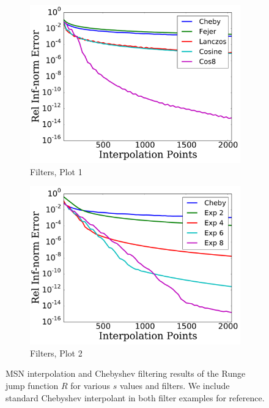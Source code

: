 \begin{figure}[p]
    \begin{subfigure}{0.45\textwidth}
    \includegraphics[width=\textwidth]{plots/cheby_interp_filter_rough_runge_jump.pdf}
    \caption{Filters, Plot 1}
    \end{subfigure}
    \begin{subfigure}{0.45\textwidth}
    \includegraphics[width=\textwidth]{plots/cheby_interp_filter_2_rough_runge_jump.pdf}
    \caption{Filters, Plot 2}
    \end{subfigure}
\caption[Rough Interpolation Comparison: Runge Jump Function]{
MSN interpolation and Chebyshev filtering results of the Runge jump
function $R$ for various $s$ values and filters.
We include standard Chebyshev interpolant in both filter examples for reference.
}
\label{fig:rough_comparison_runge_jump}
\end{figure}



